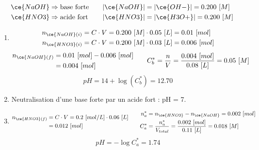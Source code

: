 \documentclass[
  11pt,
  french,
  a4paper,
  openany]{book}
\begin{document}
\begin{Answer}

\[
\begin{split}
\ce{NaOH} &\Rightarrow \text{base forte} \\
\ce{HNO3} &\Rightarrow \text{acide fort}
\end{split}
\qquad
\begin{split}
|\ce{NaOH}| &= |\ce{OH-}| = 0.200\ [M] \\
|\ce{HNO3}| &= |\ce{H3O+}| = 0.200\ [M]
\end{split}
\]

\begin{enumerate}
\def\labelenumi{\alph{enumi}.}
\item
  \[
  \begin{split}
  n_{\ce{NaOH}(i)} &= C \cdot V = 0.200\ [M] \cdot 0.05\ [L] = 0.01\ [mol] \\
  n_{\ce{HNO3}(i)} &= C \cdot V = 0.200\ [M] \cdot 0.03\ [L] = 0.006\ [mol]
  \end{split}
  \]
  \[
  \begin{split}
  n_{\ce{NaOH}(f)} &= 0.01\ [mol] - 0.006\ [mol] \\
    &= 0.004\ [mol]
  \end{split}
  \qquad
  \begin{split}
  C_{b}^{*} = \frac{n}{V} = \frac{0.004\ [mol]}{0.08\ [L]} = 0.05\ [M]
  \end{split}
  \]
  \[
  pH = 14 + \log(C_{b}^{*}) = 12.70
  \]
\item
  Neutralisation d'une base forte par un acide fort : pH = 7.
\item
  \[
  \begin{split}
  n_{\ce{HNO3}(f)} &= C \cdot V = 0.2\ [mol/L] \cdot 0.06\ [L] \\
    &= 0.012\ [mol]
  \end{split}
  \qquad
  \begin{split}
  n_{a}^{*} &= n_{\ce{HNO3}} - n_{\ce{NaOH}} = 0.002\ [mol] \\
  C_{a}^{*} &= \frac{n_{a}^{*}}{V_{total}} = \frac{0.002\ [mol]}{0.11\ [L]} = 0.018\ [M]
  \end{split}
  \]
  \[
  pH = - \log C_{a}^{*} = 1.74
  \]
\end{enumerate}

\clearpage


\end{Answer}
\end{document}
